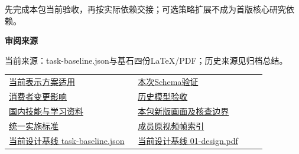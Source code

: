 \documentclass[11pt,a4paper]{article}
\newcommand{\reviewsubsection}[1]{\par\Needspace{4\baselineskip}\vspace{4pt}\begin{center}{\titlelatin\titlecjk\bfseries\fontsize{12}{18}\selectfont #1}\end{center}}
\begin{document}
先完成本包当前验收，再按实际依赖交接；可选策略扩展不成为首版核心研究依赖。


\begin{minipage}{\linewidth}
\reviewsubsection{3.4 审阅来源}
当前来源：task-\allowbreak{}baseline.json与基石四份LaTeX/\allowbreak{}PDF；历史来源见归档总结。


\begingroup\small\setlength{\tabcolsep}{4pt}\begin{tabular}{@{}p{0.48\linewidth}p{0.48\linewidth}@{}}
\href{file:///D:/Agent/srp/agent/tasks/R-01/outputs/current-representation.md}{当前表示方案适用} & \href{file:///D:/Agent/srp/agent/tasks/R-01/evidence/verification.json}{本次Schema验证}\\[4pt]
\href{file:///D:/Agent/srp/agent/tasks/R-01/evidence/consumer-impact.md}{消费者变更影响} & \href{file:///D:/Agent/srp/agent/governance/planning/2026-08-05_SRP_IJHCI_\%E5\%85\%A8\%E9\%A1\%B9\%E7\%9B\%AE1-12\%E6\%AD\%A5\%E8\%A7\%84\%E5\%88\%92\%E8\%AE\%BE\%E8\%AE\%A1\%E5\%8C\%85_v1.0/20_\%E4\%BA\%A7\%E5\%93\%81\%E4\%B8\%8E\%E5\%9C\%BA\%E6\%99\%AF\%E8\%AE\%BE\%E8\%AE\%A1/R-01_\%E5\%9B\%9B\%E5\%B1\%82\%E8\%A1\%A8\%E7\%A4\%BA\%E6\%96\%B9\%E6\%A1\%88/R-01_\%E9\%AA\%8C\%E6\%94\%B6\%E8\%AE\%B0\%E5\%BD\%95.md}{历史模型验收}\\[4pt]
\href{file:///D:/Agent/srp/agent/governance/planning/2026-08-05_SRP_IJHCI_\%E5\%85\%A8\%E9\%A1\%B9\%E7\%9B\%AE1-12\%E6\%AD\%A5\%E8\%A7\%84\%E5\%88\%92\%E8\%AE\%BE\%E8\%AE\%A1\%E5\%8C\%85_v1.0/24_\%E5\%9B\%A2\%E9\%98\%9F\%E4\%BB\%BB\%E5\%8A\%A1\%E4\%B8\%8E\%E9\%A1\%B9\%E7\%9B\%AE\%E6\%B2\%BB\%E7\%90\%86/08_\%E4\%BB\%BB\%E5\%8A\%A1\%E6\%8A\%80\%E8\%83\%BD\%E4\%B8\%8E\%E5\%9B\%BD\%E5\%86\%85\%E5\%AD\%A6\%E4\%B9\%A0\%E8\%B5\%84\%E6\%96\%99_v1.0.md}{国内技能与学习资料} & \href{file:///D:/Agent/srp/agent/tasks/R-01/outputs/current-implementation-evidence.md}{本包新版画面及核查边界}\\[4pt]
\href{file:///D:/Agent/srp/agent/design/weather/2026-10-08_Storm\%E4\%B8\%8E\%E7\%BA\%AF\%E7\%B2\%92\%E5\%AD\%90\%E5\%8F\%8C\%E7\%8E\%AF\%E5\%AE\%9E\%E6\%96\%BD\%E6\%A0\%87\%E5\%87\%86.md}{统一实施标准} & \href{file:///D:/Agent/srp/human/assets/previews/2026-10-08/member-storm-particle-rings/frame-index.json}{成员原视频帧索引}\\[4pt]
\href{file:///D:/Agent/srp/agent/design/design-foundation-20261008/task-baseline.json}{当前设计基线 task-\allowbreak{}baseline.json} & \href{file:///D:/Agent/srp/agent/design/design-foundation-20261008/01-design.pdf}{当前设计基线 01-\allowbreak{}design.pdf}\\[4pt]

\end{tabular}
\end{minipage}
\end{document}

